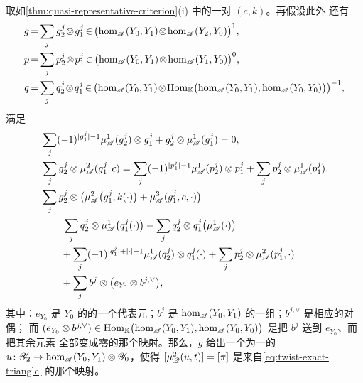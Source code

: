 \begin{lemma}\label{thm:third-morphism-realization}
取如\cref{thm:quasi-representative-criterion}(i) 中的一对 $(c,k)$。再假设此外
还有
\begin{equation*}
\medmuskip=1.5mu\relax\thickmuskip=3mu\relax
\begin{aligned}
g&=\sum_j g_2^j\otimes g_1^j\in
\bigl(\hom_{\scr{A}}(Y_0,Y_1)\otimes\hom_{\scr{A}}(Y_2,Y_0)\bigr)^{1},\\
p&=\sum_j p_2^j\otimes p_1^j\in
\bigl(\hom_{\scr{A}}(Y_0,Y_1)\otimes\hom_{\scr{A}}(Y_1,Y_0)\bigr)^{0},\\
q&=\sum_j q_2^j\otimes q_1^j\in\bigl(\hom_{\scr{A}}(Y_0,Y_1)\otimes
\Hom_{\KK}\bigl(\hom_{\scr{A}}(Y_0,Y_1),\hom_{\scr{A}}(Y_0,Y_0)\bigr)\bigr)^{-1},
\end{aligned}
\end{equation*}
满足
\begin{equation*}
\begin{aligned}
&\sum_j(-1)^{|g_1^j|-1}\mu^1_{\mathscr{A}}(g_2^j)\otimes g_1^j
+g_2^j\otimes\mu^1_{\mathscr{A}}(g_1^j)=0,\\
&\sum_j g_2^j\otimes\mu^2_{\mathscr{A}}(g_1^j,c)
=\sum_j(-1)^{|p_1^j|-1}\mu^1_{\mathscr{A}}(p_2^j)\otimes p_1^j
+\sum_j p_2^j\otimes\mu^1_{\mathscr{A}}(p_1^j),\\
&\sum_j g_2^j\otimes\bigl(\mu^2_{\mathscr{A}}\bigl(g_1^j,k(\cdot)\bigr)
+\mu^3_{\mathscr{A}}(g_1^j,c,\cdot)\bigr)\\
&\quad=\sum_j q_2^j\otimes\mu^1_{\mathscr{A}}\bigl(q_1^j(\cdot)\bigr)
-\sum_j q_2^j\otimes q_1^j\bigl(\mu^1_{\mathscr{A}}(\cdot)\bigr)\\
&\qquad+\sum_j(-1)^{|q_1^j|+|\cdot|-1}\mu^1_{\mathscr{A}}(q_2^j)\otimes q_1^j(\cdot)
+\sum_j p_2^j\otimes\mu^2_{\mathscr{A}}(p_1^j,\cdot)\\
&\qquad+\sum_j b^j\otimes\bigl(e_{Y_0}\otimes b^{j,\vee}\bigr),
\end{aligned}
\end{equation*}
其中：$e_{Y_0}$ 是 $Y_0$ 的\trIdentityMorphism{}的一个代表元；$b^j$ 是
$\hom_{\mathscr{A}}(Y_0,Y_1)$ 的一组\trBasis；$b^{j,\vee}$ 是相应的对偶\trBasis；
而 $(e_{Y_0}\otimes b^{j,\vee})\in\operatorname{Hom}_{\mathbb{K}}\bigl(\hom_{\mathscr{A}}(Y_0,Y_1),
\hom_{\mathscr{A}}(Y_0,Y_0)\bigr)$ 是把 $b^j$ 送到 $e_{Y_0}$、而把其余\trBasis{}元素
全部变成零的那个\trLinear{}映射。那么，$g$ 给出一个\trDegree{}为一的%
\trModule{}\trHomomorphism{} $u\colon\mathscr{Y}_2\to
\hom_{\mathscr{A}}(Y_0,Y_1)\otimes\mathscr{Y}_0$，使得 $[\mu^2_{\mathscr{Q}}(u,t)]=[\pi]$
是来自\eqref{eq:twist-exact-triangle} 的那个映射。
\end{lemma}

